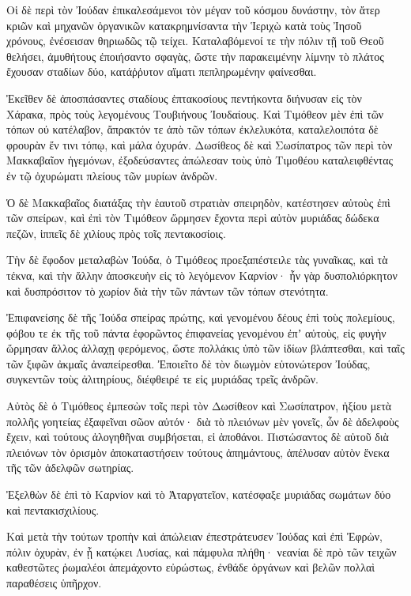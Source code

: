 {Οἱ δὲ περὶ τὸν Ἰούδαν ἐπικαλεσάμενοι τὸν μέγαν τοῦ κόσμου δυνάστην, τὸν ἄτερ κριῶν καὶ μηχανῶν ὀργανικῶν κατακρημνίσαντα τὴν Ἱεριχὼ κατὰ τοὺς Ἰησοῦ χρόνους, ἐνέσεισαν θηριωδῶς τῷ τείχει.
Καταλαβόμενοί τε τὴν πόλιν τῇ τοῦ Θεοῦ θελήσει, ἀμυθήτους ἐποιήσαντο σφαγὰς, ὥστε τὴν παρακειμένην λίμνην τὸ πλάτος ἔχουσαν σταδίων δύο, κατάῤῥυτον αἵματι πεπληρωμένην φαίνεσθαι.
\par }{\PP {}Ἐκεῖθεν δὲ ἀποσπάσαντες σταδίους ἑπτακοσίους πεντήκοντα διήνυσαν εἰς τὸν Χάρακα, πρὸς τοὺς λεγομένους Τουβιήνους Ἰουδαίους.
Καὶ Τιμόθεον μὲν ἐπὶ τῶν τόπων οὐ κατέλαβον, ἄπρακτόν τε ἀπὸ τῶν τόπων ἐκλελυκότα, καταλελοιπότα δὲ φρουρὰν ἔν τινι τόπῳ, καὶ μάλα ὀχυράν.
Δωσίθεος δὲ καὶ Σωσίπατρος τῶν περὶ τὸν Μακκαβαῖον ἡγεμόνων, ἐξοδεύσαντες ἀπώλεσαν τοὺς ὑπὸ Τιμοθέου καταλειφθέντας ἐν τῷ ὀχυρώματι πλείους τῶν μυρίων ἀνδρῶν.
\par }{\PP {}Ὁ δὲ Μακκαβαῖος διατάξας τὴν ἑαυτοῦ στρατιὰν σπειρηδὸν, κατέστησεν αὐτοὺς ἐπὶ τῶν σπείρων, καὶ ἐπὶ τὸν Τιμόθεον ὥρμησεν ἔχοντα περὶ αὐτὸν μυριάδας δώδεκα πεζῶν, ἱππεῖς δὲ χιλίους πρὸς τοῖς πεντακοσίοις.
\par }{\PP {}Τὴν δὲ ἔφοδον μεταλαβὼν Ἰούδα, ὁ Τιμόθεος προεξαπέστειλε τὰς γυναῖκας, καὶ τὰ τέκνα, καὶ τὴν ἄλλην ἀποσκευὴν εἰς τὸ λεγόμενον Καρνίον· ἦν γὰρ δυσπολιόρκητον καὶ δυσπρόσιτον τὸ χωρίον διὰ τὴν τῶν πάντων τῶν τόπων στενότητα.
\par }{\PP {}Ἐπιφανείσης δὲ τῆς Ἰούδα σπείρας πρώτης, καὶ γενομένου δέους ἐπὶ τοὺς πολεμίους, φόβου τε ἐκ τῆς τοῦ πάντα ἐφορῶντος ἐπιφανείας γενομένου ἐπʼ αὐτοὺς, εἰς φυγὴν ὥρμησαν ἄλλος ἀλλαχῃ φερόμενος, ὥστε πολλάκις ὑπὸ τῶν ἰδίων βλάπτεσθαι, καὶ ταῖς τῶν ξιφῶν ἀκμαῖς ἀναπείρεσθαι.
Ἐποιεῖτο δὲ τὸν διωγμὸν εὐτονώτερον Ἰούδας, συγκεντῶν τοὺς ἀλιτηρίους, διέφθειρέ τε εἰς μυριάδας τρεῖς ἀνδρῶν.
\par }{\PP {}Αὐτὸς δὲ ὁ Τιμόθεος ἐμπεσὼν τοῖς περὶ τὸν Δωσίθεον καὶ Σωσίπατρον, ἠξίου μετὰ πολλῆς γοητείας ἐξαφεῖναι σῶον αὐτόν· διὰ τὸ πλειόνων μὲν γονεῖς, ὧν δὲ ἀδελφοὺς ἔχειν, καὶ τούτους ἀλογηθῆναι συμβήσεται, εἰ ἀποθάνοι.
Πιστώσαντος δὲ αὐτοῦ διὰ πλειόνων τὸν ὁρισμὸν ἀποκαταστήσειν τούτους ἀπημάντους, ἀπέλυσαν αὐτὸν ἕνεκα τῆς τῶν ἀδελφῶν σωτηρίας.
\par }{\PP {}Ἐξελθὼν δὲ ἐπὶ τὸ Καρνίον καὶ τὸ Ἀταργατεῖον, κατέσφαξε μυριάδας σωμάτων δύο καὶ πεντακισχιλίους.
\par }{\PP {}Καὶ μετὰ τὴν τούτων τροπὴν καὶ ἀπώλειαν ἐπεστράτευσεν Ἰούδας καὶ ἐπὶ Ἐφρὼν, πόλιν ὀχυρὰν, ἐν ᾗ κατῴκει Λυσίας, καὶ πάμφυλα πλήθη· νεανίαι δὲ πρὸ τῶν τειχῶν καθεστῶτες ῥωμαλέοι ἀπεμάχοντο εὐρώστως, ἐνθάδε ὀργάνων καὶ βελῶν πολλαὶ παραθέσεις ὑπῆρχον.
}

